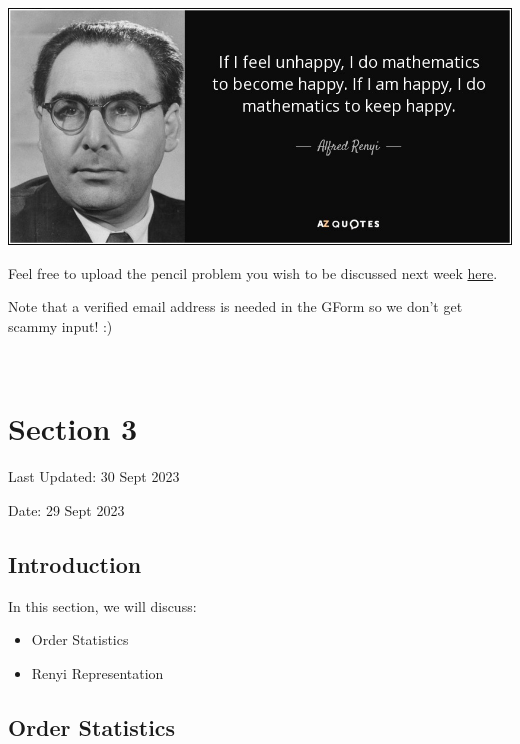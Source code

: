 \documentclass[
  letterpaper,
  DIV=11,
  numbers=noendperiod]{scrreprt}
\providecommand{\tightlist}{%
  \setlength{\itemsep}{0pt}\setlength{\parskip}{0pt}}\usepackage{longtable,booktabs,array}
\theoremstyle{definition}
\theoremstyle{plain}
\theoremstyle{remark}
\begin{document}
\includegraphics{./assets/img/renyi.jpeg}

Feel free to upload the pencil problem you wish to be discussed next
week \href{https://forms.gle/RBmMNYJp4u3qD5W79}{here}.

Note that a verified email address is needed in the GForm so we don't
get scammy input! :)

\(\,\)


\hypertarget{section-3}{%
\chapter*{Section 3}\label{section-3}}


Last Updated: 30 Sept 2023

Date: 29 Sept 2023

\hypertarget{introduction-2}{%
\section*{Introduction}\label{introduction-2}}


In this section, we will discuss:

\begin{itemize}
\tightlist
\item
  Order Statistics
\item
  Renyi Representation
\end{itemize}

\hypertarget{order-statistics}{%
\section*{Order Statistics}\label{order-statistics}}
\end{document}
